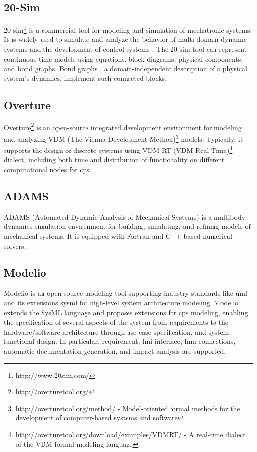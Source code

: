 \subsection{20-Sim}
\label{susec:20sim}


20-sim\footnote{http://www.20sim.com/} is a commercial tool for modeling and simulation of mechatronic systems. It is widely used to simulate and analyze the behavior of multi-domain dynamic systems and the development of control systems \cite{20sim,20simduindam,20simjan}. The 20-sim tool can represent continuous time models using equations, block diagrams, physical components, and bond graphs. Bond graphs \cite{20simgawthrop}, a domain-independent description of a physical system's dynamics, implement such connected blocks.


\subsection{Overture}
\label{sec:overture}

Overture\footnote{http://overturetool.org/} is an open-source integrated development environment for modeling and analyzing VDM (The Vienna Development Method)\footnote{http://overturetool.org/method/ - Model-oriented formal methods for the development of computer-based systems and software} models. Typically, it supports \cite{overtureverhoef} the design of discrete systems using VDM-RT (VDM-Real Time)\footnote{http://overturetool.org/download/examples/VDMRT/ - A real-time dialect of the VDM formal modeling language} dialect, including both time and distribution of functionality on different computational nodes for \acrshort{cps}.


\subsection{ADAMS}
\label{sec:adams}

ADAMS (Automated Dynamic Analysis of Mechanical Systems) \cite{adams} is a multibody dynamics simulation environment for building, simulating, and refining models of mechanical systems. It is equipped with Fortran and C++-based numerical solvers. 

\subsection{Modelio}
\label{sec:modelio}

Modelio \cite{modelio} is an open-source modeling tool supporting industry standards like \acrshort{uml} and its extensions \acrshort{sysml} for high-level system architecture modeling. Modelio extends the SysML language \cite{sysml, sysmlmorgan} and proposes extensions for \acrshort{cps} modeling, enabling the specification of several aspects of the system from requirements to the hardware/software architecture through use case specification, and system functional design. In particular, requirement, \acrshort{fmi} interface, \acrshort{fmu} connections, automatic documentation generation, and impact analysis are supported. 

